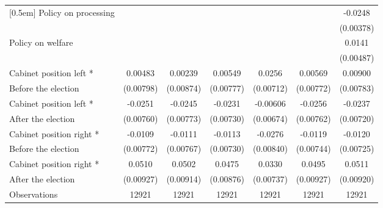 \begin{table}[!ht]
\begin{tabular}{l*{6}{c}}
[0.5em]
Policy on processing&                     &                     &                     &                     &                     &     -0.0248\sym{***}\\
                    &                     &                     &                     &                     &                     &   (0.00378)         \\
[0.5em]
Policy on welfare   &                     &                     &                     &                     &                     &      0.0141\sym{**} \\
                    &                     &                     &                     &                     &                     &   (0.00487)         \\
[0.5em]
Cabinet position left * &     0.00483         &     0.00239         &     0.00549         &      0.0256\sym{***}&     0.00569         &     0.00900         \\
Before the election                    &   (0.00798)         &   (0.00874)         &   (0.00777)         &   (0.00712)         &   (0.00772)         &   (0.00783)         \\
[0.5em]
Cabinet position left * &     -0.0251\sym{**} &     -0.0245\sym{**} &     -0.0231\sym{**} &    -0.00606         &     -0.0256\sym{**} &     -0.0237\sym{**} \\
 After the election                   &   (0.00760)         &   (0.00773)         &   (0.00730)         &   (0.00674)         &   (0.00762)         &   (0.00720)         \\
[0.5em]
Cabinet position right * &     -0.0109         &     -0.0111         &     -0.0113         &     -0.0276\sym{**} &     -0.0119         &     -0.0120         \\
 Before the election                   &   (0.00772)         &   (0.00767)         &   (0.00730)         &   (0.00840)         &   (0.00744)         &   (0.00725)         \\
[0.5em]
Cabinet position right * &      0.0510\sym{***}&      0.0502\sym{***}&      0.0475\sym{***}&      0.0330\sym{***}&      0.0495\sym{***}&      0.0511\sym{***}\\
 After the election                   &   (0.00927)         &   (0.00914)         &   (0.00876)         &   (0.00737)         &   (0.00927)         &   (0.00920)         \\
\hline
Observations        &       12921         &       12921         &       12921         &       12921         &       12921         &       12921         \\

\end{tabular}
\end{table}
